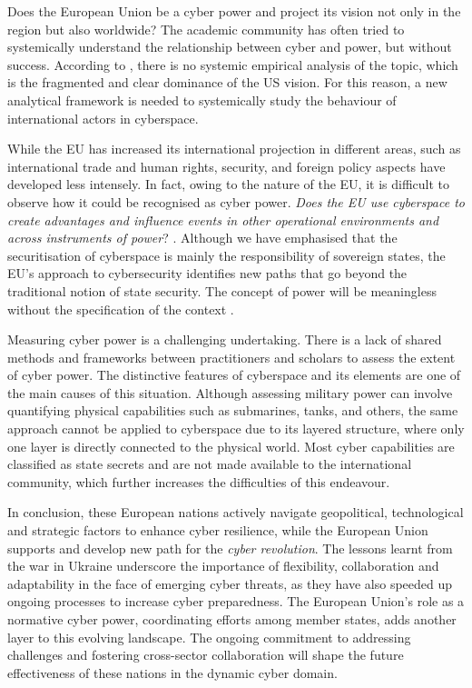 Does the European Union be a cyber power and project its vision not only in the region but also worldwide? The academic community has often tried to systemically understand the relationship between cyber and power, but without success. According to \textcite{dunncavelty_2018_europes}, there is no systemic empirical analysis of the topic, which is the fragmented and clear dominance of the US vision. For this reason, a new analytical framework is needed to systemically study the behaviour of international actors in cyberspace. 


While the EU has increased its international projection in different areas, such as international trade and human rights, security, and foreign policy aspects have developed less intensely. In fact, owing to the nature of the EU, it is difficult to observe how it could be recognised as cyber power. \textit{Does the EU use cyberspace to create advantages and influence events in other operational environments and across instruments of power}? \autocite[12]{kuehl_2009_from}. Although we have emphasised that the securitisation of cyberspace is mainly the responsibility of sovereign states, the EU's approach to cybersecurity identifies new paths that go beyond the traditional notion of state security. The concept of power will be meaningless without the specification of the context \autocite[454]{guzzini_1993_structural}. 

Measuring cyber power is a challenging undertaking. There is a lack of shared methods and frameworks between practitioners and scholars to assess the extent of cyber power. The distinctive features of cyberspace and its elements are one of the main causes of this situation. Although assessing military power can involve quantifying physical capabilities such as submarines, tanks, and others, the same approach cannot be applied to cyberspace due to its layered structure, where only one layer is directly connected to the physical world. Most cyber capabilities are classified as state secrets and are not made available to the international community, which further increases the difficulties of this endeavour.

In conclusion, these European nations actively navigate geopolitical, technological and strategic factors to enhance cyber resilience, while the European Union supports and develop new path for the \textit{cyber revolution}. The lessons learnt from the war in Ukraine underscore the importance of flexibility, collaboration and adaptability in the face of emerging cyber threats, as they have also speeded up ongoing processes to increase cyber preparedness. The European Union's role as a normative cyber power, coordinating efforts among member states, adds another layer to this evolving landscape. The ongoing commitment to addressing challenges and fostering cross-sector collaboration will shape the future effectiveness of these nations in the dynamic cyber domain. 
